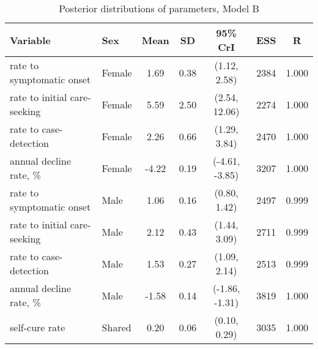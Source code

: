 \begin{table}[h]

\caption{\label{tab:}Posterior distributions of parameters, Model B}
\centering
\begin{tabular}[t]{llccccc}
\toprule
Variable & Sex & Mean & SD & 95\% CrI & ESS & \^{R}\\
\midrule
rate to symptomatic onset & Female & 1.69 & 0.38 & (1.12, 2.58) & 2384 & 1.000\\
rate to initial care-seeking & Female & 5.59 & 2.50 & (2.54, 12.06) & 2274 & 1.000\\
rate to case-detection & Female & 2.26 & 0.66 & (1.29, 3.84) & 2470 & 1.000\\
annual decline rate, \% & Female & -4.22 & 0.19 & (-4.61, -3.85) & 3207 & 1.000\\
\addlinespace
rate to symptomatic onset & Male & 1.06 & 0.16 & (0.80, 1.42) & 2497 & 0.999\\
rate to initial care-seeking & Male & 2.12 & 0.43 & (1.44, 3.09) & 2711 & 0.999\\
rate to case-detection & Male & 1.53 & 0.27 & (1.09, 2.14) & 2513 & 0.999\\
annual decline rate, \% & Male & -1.58 & 0.14 & (-1.86, -1.31) & 3819 & 1.000\\
\addlinespace
self-cure rate & Shared & 0.20 & 0.06 & (0.10, 0.29) & 3035 & 1.000\\
\bottomrule
\end{tabular}
\end{table}
